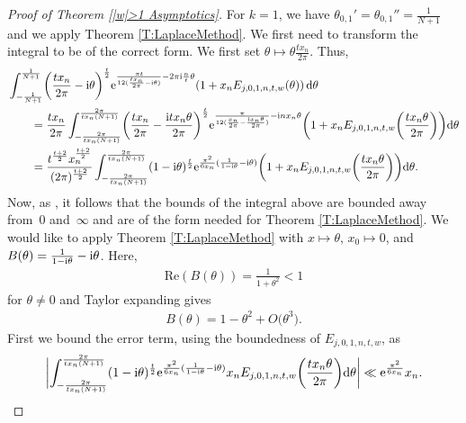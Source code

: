 \documentclass[pdftex]{sigma}
\numberwithin{equation}{section}
\def\lp{\left(}
\def\rp{\right)}
\begin{document}
\begin{proof}[Proof of Theorem \ref{|w|>1 Asymptotics}]
For $k=1$, we have $\theta_{0,1}'=\theta_{0,1}''=\frac{1}{N+1}$ and we apply Theorem \ref{T:LaplaceMethod}.
We first need to transform the integral to be of the correct form. We first set $\theta \mapsto \theta \frac{tx_n}{2\pi}$. Thus,
\begin{align}
 &\int_{-\frac{1}{N+1}}^{\frac{1}{N+1}} \biggl(\frac{tx_n}{2\pi}-{\rm i}\theta\biggr)^{\frac{t}{2}}{\rm e}^{\frac{\pi t}{12(\frac{tx_n}{2\pi}-{\rm i}\theta)}-2\pi {\rm i} \frac{n}{t} \theta} (1+x_n E_{j,0,1,n,t,w}(\theta)) \,{\rm d}\theta \nonumber \\
 &\qquad{}=\frac{tx_n}{2\pi}\int_{-\frac{2\pi}{tx_n(N+1)}}^{\frac{2\pi}{tx_n(N+1)}} \biggl(\frac{tx_n}{2\pi}-\frac{{\rm i}tx_n\theta}{2\pi}\biggr)^{\frac{t}{2}}{\rm e}^{\frac{\pi}{12(\frac{x_n}{2\pi}-\frac{{\rm i}x_n\theta}{2\pi})}- {\rm i} nx_n \theta} \biggl(1+x_n E_{j,0,1,n,t,w}\biggl(\frac{tx_n\theta}{2\pi}\biggr)\biggr) {\rm d}\theta \nonumber \\
 &\qquad{}=\frac{t^{\frac{t+2}{2}}x_n^{\frac{t+2}{2}}}{(2\pi)^{\frac{t+2}{2}}}\int_{-\frac{2\pi}{tx_n(N+1)}}^{\frac{2\pi}{tx_n(N+1)}} (1-{\rm i}\theta)^{\frac{t}{2}}{\rm e}^{\frac{\pi^2}{6x_n}( \frac{1}{1-{\rm i}\theta}- {\rm i} \theta)} \biggl(1+x_n E_{j,0,1,n,t,w}\biggl(\frac{tx_n\theta}{2\pi}\biggr)\biggr) {\rm d}\theta. \label{E:MainRewrite}
\end{align}
Now, as , it follows that the bounds of the integral above are bounded away from~0 and~$\infty$ and are of the form needed for Theorem \ref{T:LaplaceMethod}. We would like to apply Theorem \ref{T:LaplaceMethod} with $x\mapsto \theta$, $x_0\mapsto 0$,  and $B(\theta)=\frac{1}{1-{\rm i}\theta}- {\rm i} \theta$. Here,
\begin{align*}
 \mathrm{Re} \lp B(\theta) \rp = \frac{1}{1+\theta^2}< 1
\end{align*}
for $\theta \neq 0$ and Taylor expanding gives
\begin{align*}
 B(\theta)=1-\theta^2+O\big(\theta^3\big).
\end{align*}
First we bound the error term, using the boundedness of $E_{j,0,1,n,t,w}$, as
\begin{equation}\label{E:MainTerm}
\biggl|\int_{-\frac{2\pi}{tx_n(N+1)}}^{\frac{2\pi}{tx_n(N+1)}} (1-{\rm i}\theta)^{\frac{t}{2}}{\rm e}^{\frac{\pi^2}{6x_n}( \frac{1}{1-{\rm i}\theta}- {\rm i}\theta)} x_n E_{j,0,1,n,t,w}\biggl(\frac{tx_n\theta}{2\pi}\biggr) {\rm d}\theta \biggr| \ll {\rm e}^{\frac{\pi^2}{6x_n}}x_n.
\end{equation}

\end{proof}
\end{document}
